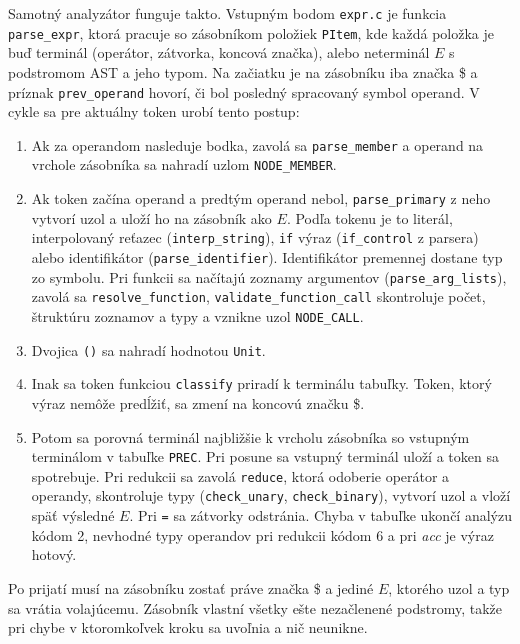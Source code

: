 \medskip
\noindent Samotný analyzátor funguje takto. Vstupným bodom \texttt{expr.c} je funkcia \texttt{parse\_expr}, ktorá pracuje so zásobníkom položiek \texttt{PItem}, kde každá položka je buď terminál (operátor, zátvorka, koncová značka), alebo neterminál $E$ s podstromom AST a jeho typom. Na začiatku je na zásobníku iba značka \$ a príznak \texttt{prev\_operand} hovorí, či bol posledný spracovaný symbol operand. V cykle sa pre aktuálny token urobí tento postup:
\begin{enumerate}
    \item Ak za operandom nasleduje bodka, zavolá sa \texttt{parse\_member} a operand na vrchole zásobníka sa nahradí uzlom \texttt{NODE\_MEMBER}.
    \item Ak token začína operand a predtým operand nebol, \texttt{parse\_primary} z neho vytvorí uzol a uloží ho na zásobník ako $E$. Podľa tokenu je to literál, interpolovaný reťazec (\texttt{interp\_string}), \texttt{if} výraz (\texttt{if\_control} z parsera) alebo identifikátor (\texttt{parse\_identifier}). Identifikátor premennej dostane typ zo symbolu. Pri funkcii sa načítajú zoznamy argumentov (\texttt{parse\_arg\_lists}), zavolá sa \texttt{resolve\_function}, \texttt{validate\_function\_call} skontroluje počet, štruktúru zoznamov a typy a vznikne uzol \texttt{NODE\_CALL}.
    \item Dvojica \texttt{()} sa nahradí hodnotou \texttt{Unit}.
    \item Inak sa token funkciou \texttt{classify} priradí k terminálu tabuľky. Token, ktorý výraz nemôže predĺžiť, sa zmení na koncovú značku \$.
    \item Potom sa porovná terminál najbližšie k vrcholu zásobníka so vstupným terminálom v tabuľke \texttt{PREC}. Pri posune sa vstupný terminál uloží a token sa spotrebuje. Pri redukcii sa zavolá \texttt{reduce}, ktorá odoberie operátor a operandy, skontroluje typy (\texttt{check\_unary}, \texttt{check\_binary}), vytvorí uzol a vloží späť výsledné $E$. Pri \texttt{=} sa zátvorky odstránia. Chyba v tabuľke ukončí analýzu kódom 2, nevhodné typy operandov pri redukcii kódom 6 a pri \emph{acc} je výraz hotový.
\end{enumerate}
Po prijatí musí na zásobníku zostať práve značka \$ a jediné $E$, ktorého uzol a typ sa vrátia volajúcemu. Zásobník vlastní všetky ešte nezačlenené podstromy, takže pri chybe v ktoromkoľvek kroku sa uvoľnia a nič neunikne.
